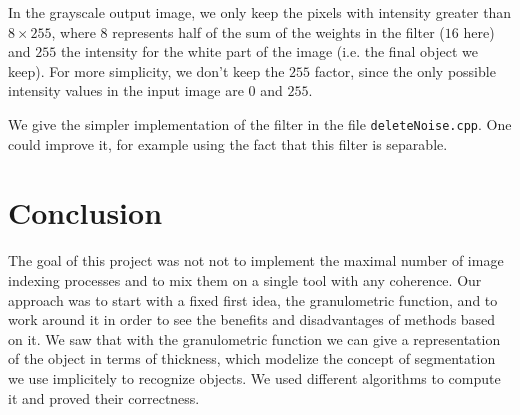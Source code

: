 In the grayscale output image, we only keep the pixels with intensity greater than $8 \times 255$, where $8$ represents half of the sum of the weights in the filter ($16$ here) and $255$ the intensity for the white part of the image (i.e. the final object we keep). For more simplicity, we don't keep the $255$ factor, since the only possible intensity values in the input image are $0$ and $255$.

We give the simpler implementation of the filter in the file \texttt{deleteNoise.cpp}. One could improve it, for example using the fact that this filter is separable.

\section*{Conclusion}

The goal of this project was not not to implement the maximal number of image indexing processes and to mix them on a single tool with any coherence. Our approach was to start with a fixed first idea, the granulometric function, and to work around it in order to see the benefits and disadvantages of methods based on it. We saw that with the granulometric function we can give a representation of the object in terms of thickness, which modelize the concept of segmentation we use implicitely to recognize objects. We used different algorithms to compute it and proved their correctness.






